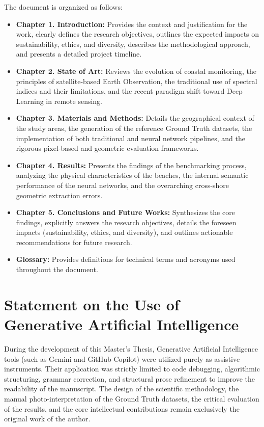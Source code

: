 ﻿\documentclass[ENG]{TFUOC}%
\begin{document}
The document is organized as follows:
\begin{itemize}
    \item \textbf{Chapter 1. Introduction:} Provides the context and justification for the work, clearly defines the research objectives, outlines the expected impacts on sustainability, ethics, and diversity, describes the methodological approach, and presents a detailed project timeline.
    \item \textbf{Chapter 2. State of Art:} Reviews the evolution of coastal monitoring, the principles of satellite-based Earth Observation, the traditional use of spectral indices and their limitations, and the recent paradigm shift toward Deep Learning in remote sensing.
    \item \textbf{Chapter 3. Materials and Methods:} Details the geographical context of the study areas, the generation of the reference Ground Truth datasets, the implementation of both traditional and neural network pipelines, and the rigorous pixel-based and geometric evaluation frameworks.
    \item \textbf{Chapter 4. Results:} Presents the findings of the benchmarking process, analyzing the physical characteristics of the beaches, the internal semantic performance of the neural networks, and the overarching cross-shore geometric extraction errors.
    \item \textbf{Chapter 5. Conclusions and Future Works:} Synthesizes the core findings, explicitly answers the research objectives, details the foreseen impacts (sustainability, ethics, and diversity), and outlines actionable recommendations for future research.
    \item \textbf{Glossary:} Provides definitions for technical terms and acronyms used throughout the document.
\end{itemize}

\section{Statement on the Use of Generative Artificial Intelligence}

During the development of this Master's Thesis, Generative Artificial Intelligence tools (such as Gemini and GitHub Copilot) were utilized purely as assistive instruments. Their application was strictly limited to code debugging, algorithmic structuring, grammar correction, and structural prose refinement to improve the readability of the manuscript. The design of the scientific methodology, the manual photo-interpretation of the Ground Truth datasets, the critical evaluation of the results, and the core intellectual contributions remain exclusively the original work of the author.
\end{document}
